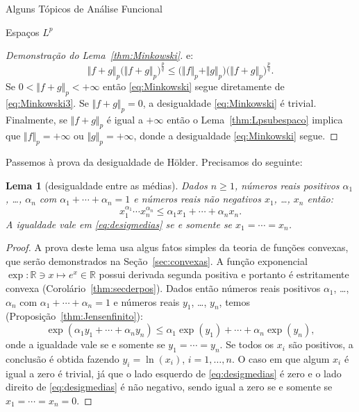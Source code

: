\documentclass[oneside,final,11pt]{amsbook}
\newcommand{\R}{\mathds R}
\theoremstyle{remark}\newtheorem{exercise}{Exercício}[chapter]
\theoremstyle{remark}\newtheorem{*exercise}[exercise]{\hbox to 0pt{\hskip 0pt minus 1fil*}Exercício}
\theoremstyle{definition}\newtheorem{exdefin}{Definição}[chapter]
\theoremstyle{plain}\newtheorem{teo}{Teorema}[section]
\theoremstyle{plain}\newtheorem{lem}[teo]{Lema}
\theoremstyle{plain}\newtheorem{prop}[teo]{Proposição}
\theoremstyle{plain}\newtheorem{cor}[teo]{Corolário}
\theoremstyle{definition}\newtheorem{defin}[teo]{Definição}
\theoremstyle{remark}\newtheorem{rem}[teo]{Observação}
\theoremstyle{definition}\newtheorem{notation}[teo]{Notação}
\theoremstyle{definition}\newtheorem{convention}[teo]{Convenção}
\theoremstyle{definition}\newtheorem{example}[teo]{Exemplo}
\numberwithin{section}{chapter}
\numberwithin{equation}{section}
\begin{document}
\begin{chapter}{Alguns Tópicos de Análise Funcional}
\begin{section}[Espaços $L^p$]{Espaços ${L^p}$}
\begin{proof}[Demonstração do Lema~\ref{thm:Minkowski}]
e:
\begin{equation}\label{eq:Minkowski3}
\Vert f+g\Vert_p\big(\Vert f+g\Vert_p\big)^{\frac pq}\le\big(\Vert f\Vert_p+\Vert g\Vert_p\big)\big(\Vert f+g\Vert_p\big)^{\frac pq}.
\end{equation}
Se $0<\Vert f+g\Vert_p<+\infty$ então \eqref{eq:Minkowski} segue diretamente de \eqref{eq:Minkowski3}.
Se $\Vert f+g\Vert_p=0$, a desigualdade \eqref{eq:Minkowski} é trivial. Finalmente,
se $\Vert f+g\Vert_p$ é igual a $+\infty$ então o Lema~\ref{thm:Lpsubespaco} implica que $\Vert f\Vert_p=+\infty$
ou $\Vert g\Vert_p=+\infty$, donde a desigualdade \eqref{eq:Minkowski} segue.
\end{proof}

Passemos à prova da desigualdade de Hölder. Precisamos do seguinte:
\begin{lem}[desigualdade entre as médias]%
\label{thm:desigmedias}
Dados $n\ge1$, números reais positivos $\alpha_1$, \dots, $\alpha_n$ com $\alpha_1+\cdots+\alpha_n=1$
e números reais não negativos $x_1$, \dots, $x_n$ então:
\begin{equation}\label{eq:desigmedias}
x_1^{\alpha_1}\cdots x_n^{\alpha_n}\le\alpha_1x_1+\cdots+\alpha_nx_n.
\end{equation}
A igualdade vale em \eqref{eq:desigmedias} se e somente se $x_1=\cdots=x_n$.
\end{lem}
\begin{proof}
A prova deste lema usa algus fatos simples da teoria de funções convexas, que serão demonstrados
na Seção~\ref{sec:convexas}. A função exponencial $\exp:\R\ni x\mapsto e^x\in\R$ possui derivada segunda positiva e portanto
é estritamente convexa (Corolário~\ref{thm:secderpos}). Dados então números reais positivos
$\alpha_1$, \dots, $\alpha_n$ com $\alpha_1+\cdots+\alpha_n=1$
e números reais $y_1$, \dots, $y_n$, temos (Proposição~\ref{thm:Jensenfinito}):
\[\exp(\alpha_1y_1+\cdots+\alpha_ny_n)\le\alpha_1\exp(y_1)+\cdots+\alpha_n\exp(y_n),\]
onde a igualdade vale se e somente se $y_1=\cdots=y_n$. Se todos os $x_i$ são positivos, a conclusão é obtida fazendo $y_i=\ln(x_i)$, $i=1,\ldots,n$.
O caso em que algum $x_i$ é igual a zero é trivial, já que o lado esquerdo de \eqref{eq:desigmedias} é zero
e o lado direito de \eqref{eq:desigmedias} é não negativo, sendo igual a zero se e somente se $x_1=\cdots=x_n=0$.
\end{proof}


\end{section}
\end{chapter}
\end{document}
